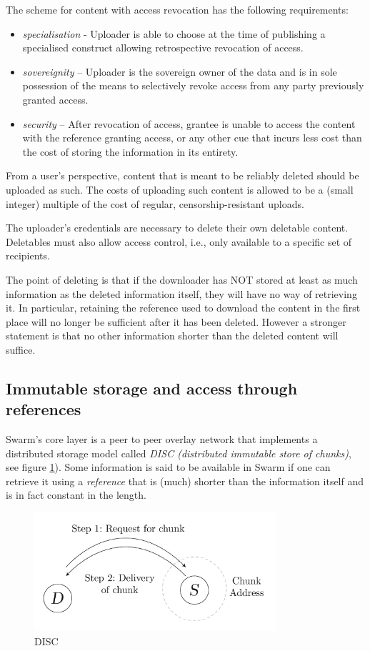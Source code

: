 The scheme for content with access revocation has the following requirements: 

\begin{itemize}
    \item \emph{specialisation} - Uploader is able to choose at the time of publishing a specialised construct allowing retrospective revocation of access.
    \item \emph{sovereignity} -- Uploader is the sovereign owner of the data and is in sole possession of the means to selectively revoke access from any party previously granted access.
    \item \emph{security} -- After revocation of access, grantee is unable to access the content with the reference granting access, or any other cue that incurs less cost than the cost of storing the information in its entirety.
\end{itemize}


From a user's perspective, content that is meant to be reliably deleted should be uploaded as such. The costs of uploading such content is allowed to be a (small integer) multiple of the cost of regular, censorship-resistant uploads. 

The uploader's credentials are necessary to delete their own deletable content. Deletables must also allow access control, i.e., only available to a specific set of recipients.

The point of deleting is that if the downloader has NOT stored at least as much information as the deleted information itself, they will have no way of retrieving it. In particular, retaining the reference used to download the content in the first place will no longer be sufficient after it has been deleted. However a stronger statement is that no other information shorter than the deleted content will suffice.


\subsection{Immutable storage and access through references}

Swarm's core layer is a peer to peer overlay network that implements a distributed storage model called \emph{DISC (distributed immutable store of chunks)}, see figure \ref{fig:disc}).  Some information is said to be available in Swarm if one can retrieve it using a \emph{reference} that is (much) shorter than the information itself and is in fact constant in the length. 


\begin{figure}[htbp]
  \centering
    \includegraphics[width=0.8\textwidth]{figs/disc.pdf}
  \caption{DISC}
\label{fig:disc}
\end{figure}

